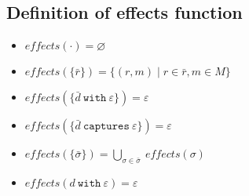 \documentclass{article}
\newcommand{\keywadj}[1]{\mathtt{#1}}
\newcommand{\keyw}[1]{\keywadj{#1}~}
\begin{document}
\subsection{Definition of effects function}

\begin{itemize}
	\item $effects(\cdot) = \varnothing$
	\item $effects(\{\bar r\}) = \{ (r, m) \mid r \in \bar r, m \in M \}$
	\item $effects(\{ \bar d~\keyw{with} \varepsilon \}) = \varepsilon$
	\item $effects(\{ \bar d~\keyw{captures} \varepsilon \}) = \varepsilon$
	\item $effects( \{ \bar \sigma \}) = \bigcup_{\sigma \in \bar \sigma}~effects(\sigma)$
	\item $effects(d~\keyw{with} \varepsilon) = \varepsilon$
\end{itemize}
\end{document}
